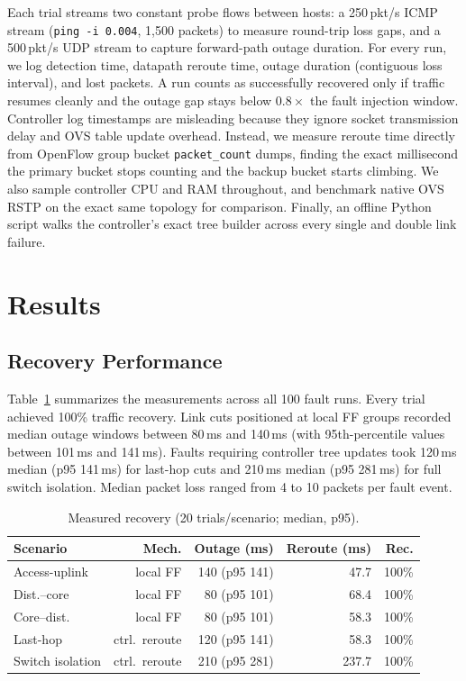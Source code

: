 \documentclass[conference]{IEEEtran}
\begin{document}
Each trial streams two constant probe flows between hosts: a 250\,pkt/s ICMP stream (\texttt{ping -i 0.004}, 1{,}500 packets) to measure round-trip loss gaps, and a 500\,pkt/s UDP stream to capture forward-path outage duration. For every run, we log detection time, datapath reroute time, outage duration (contiguous loss interval), and lost packets. A run counts as successfully recovered only if traffic resumes cleanly and the outage gap stays below $0.8\times$ the fault injection window. Controller log timestamps are misleading because they ignore socket transmission delay and OVS table update overhead. Instead, we measure reroute time directly from OpenFlow group bucket \texttt{packet\_count} dumps, finding the exact millisecond the primary bucket stops counting and the backup bucket starts climbing. We also sample controller CPU and RAM throughout, and benchmark native OVS RSTP on the exact same topology for comparison. Finally, an offline Python script walks the controller's exact tree builder across every single and double link failure.

\section{Results}\label{sec:results}
\subsection{Recovery Performance}
Table~\ref{tab:recovery} summarizes the measurements across all 100 fault runs. Every trial achieved 100\% traffic recovery. Link cuts positioned at local FF groups recorded median outage windows between 80\,ms and 140\,ms (with 95th-percentile values between 101\,ms and 141\,ms). Faults requiring controller tree updates took 120\,ms median (p95 141\,ms) for last-hop cuts and 210\,ms median (p95 281\,ms) for full switch isolation. Median packet loss ranged from 4 to 10 packets per fault event.

\begin{table}[t]
\caption{Measured recovery (20 trials/scenario; median, p95).}
\label{tab:recovery}
\centering
\footnotesize
\begin{tabular}{@{}lrrrr@{}}
\toprule
Scenario & Mech. & Outage (ms) & Reroute (ms) & Rec. \\
\midrule
Access-uplink    & local FF       & 140 (p95 141) & 47.7  & 100\% \\
Dist.--core      & local FF       & 80 (p95 101)  & 68.4  & 100\% \\
Core--dist.      & local FF       & 80 (p95 101)  & 58.3  & 100\% \\
Last-hop         & ctrl.\ reroute & 120 (p95 141) & 58.3  & 100\% \\
Switch isolation & ctrl.\ reroute & 210 (p95 281) & 237.7 & 100\% \\
\bottomrule
\end{tabular}
\end{table}
\end{document}
